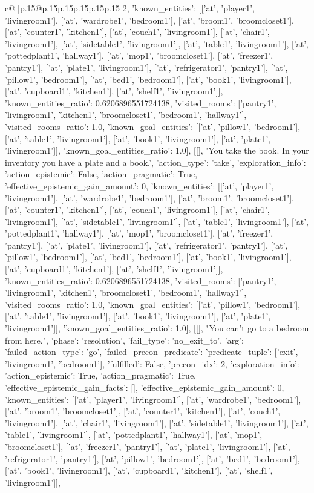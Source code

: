 \documentclass{article}
\begin{document}
{\begin{supertabular}{c@{$\;$}|p{.15\linewidth}@{}p{.15\linewidth}p{.15\linewidth}p{.15\linewidth}p{.15\linewidth}p{.15\linewidth}}
{{{2, 'known_entities': [['at', 'player1', 'livingroom1'], ['at', 'wardrobe1', 'bedroom1'], ['at', 'broom1', 'broomcloset1'], ['at', 'counter1', 'kitchen1'], ['at', 'couch1', 'livingroom1'], ['at', 'chair1', 'livingroom1'], ['at', 'sidetable1', 'livingroom1'], ['at', 'table1', 'livingroom1'], ['at', 'pottedplant1', 'hallway1'], ['at', 'mop1', 'broomcloset1'], ['at', 'freezer1', 'pantry1'], ['at', 'plate1', 'livingroom1'], ['at', 'refrigerator1', 'pantry1'], ['at', 'pillow1', 'bedroom1'], ['at', 'bed1', 'bedroom1'], ['at', 'book1', 'livingroom1'], ['at', 'cupboard1', 'kitchen1'], ['at', 'shelf1', 'livingroom1']], 'known_entities_ratio': 0.6206896551724138, 'visited_rooms': ['pantry1', 'livingroom1', 'kitchen1', 'broomcloset1', 'bedroom1', 'hallway1'], 'visited_rooms_ratio': 1.0, 'known_goal_entities': [['at', 'pillow1', 'bedroom1'], ['at', 'table1', 'livingroom1'], ['at', 'book1', 'livingroom1'], ['at', 'plate1', 'livingroom1']], 'known_goal_entities_ratio': 1.0}}], [[], 'You take the book. In your inventory you have a plate and a book.', {'action_type': 'take', 'exploration_info': {'action_epistemic': False, 'action_pragmatic': True, 'effective_epistemic_gain_amount': 0, 'known_entities': [['at', 'player1', 'livingroom1'], ['at', 'wardrobe1', 'bedroom1'], ['at', 'broom1', 'broomcloset1'], ['at', 'counter1', 'kitchen1'], ['at', 'couch1', 'livingroom1'], ['at', 'chair1', 'livingroom1'], ['at', 'sidetable1', 'livingroom1'], ['at', 'table1', 'livingroom1'], ['at', 'pottedplant1', 'hallway1'], ['at', 'mop1', 'broomcloset1'], ['at', 'freezer1', 'pantry1'], ['at', 'plate1', 'livingroom1'], ['at', 'refrigerator1', 'pantry1'], ['at', 'pillow1', 'bedroom1'], ['at', 'bed1', 'bedroom1'], ['at', 'book1', 'livingroom1'], ['at', 'cupboard1', 'kitchen1'], ['at', 'shelf1', 'livingroom1']], 'known_entities_ratio': 0.6206896551724138, 'visited_rooms': ['pantry1', 'livingroom1', 'kitchen1', 'broomcloset1', 'bedroom1', 'hallway1'], 'visited_rooms_ratio': 1.0, 'known_goal_entities': [['at', 'pillow1', 'bedroom1'], ['at', 'table1', 'livingroom1'], ['at', 'book1', 'livingroom1'], ['at', 'plate1', 'livingroom1']], 'known_goal_entities_ratio': 1.0}}], [[], "You can't go to a bedroom from here.", {'phase': 'resolution', 'fail_type': 'no_exit_to', 'arg': {'failed_action_type': 'go', 'failed_precon_predicate': {'predicate_tuple': ['exit', 'livingroom1', 'bedroom1'], 'fulfilled': False, 'precon_idx': 2}}, 'exploration_info': {'action_epistemic': True, 'action_pragmatic': True, 'effective_epistemic_gain_facts': [], 'effective_epistemic_gain_amount': 0, 'known_entities': [['at', 'player1', 'livingroom1'], ['at', 'wardrobe1', 'bedroom1'], ['at', 'broom1', 'broomcloset1'], ['at', 'counter1', 'kitchen1'], ['at', 'couch1', 'livingroom1'], ['at', 'chair1', 'livingroom1'], ['at', 'sidetable1', 'livingroom1'], ['at', 'table1', 'livingroom1'], ['at', 'pottedplant1', 'hallway1'], ['at', 'mop1', 'broomcloset1'], ['at', 'freezer1', 'pantry1'], ['at', 'plate1', 'livingroom1'], ['at', 'refrigerator1', 'pantry1'], ['at', 'pillow1', 'bedroom1'], ['at', 'bed1', 'bedroom1'], ['at', 'book1', 'livingroom1'], ['at', 'cupboard1', 'kitchen1'], ['at', 'shelf1', 'livingroom1']], }}}
\end{supertabular}}
\end{document}
